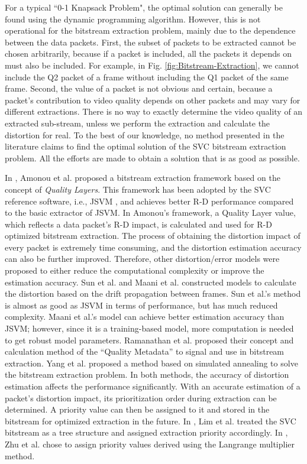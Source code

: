 \documentclass[journal]{IEEEtran}
\begin{document}
For a typical ``0-1 Knapsack Problem", the optimal solution can generally be found using the dynamic programming algorithm. However, this is not operational for the bitstream extraction problem, mainly due to the dependence between the data packets. First, the subset of packets to be extracted cannot be chosen arbitrarily, because if a packet is included, all the packets it depends on must also be included. For example, in Fig. \ref{fig:Bitstream-Extraction}, we cannot include the Q2 packet of a frame without including the Q1 packet of the same frame. Second, the value of a packet is not obvious and certain, because a packet's contribution to video quality depends on other packets and may vary for different extractions. There is no way to exactly determine the video quality of an extracted sub-stream, unless we perform the extraction and calculate the distortion for real. To the best of our knowledge, no method presented in the literature claims to find the optimal solution of the SVC bitstream extraction problem. All the efforts are made to obtain a solution that is as good as possible.

In \cite{Amonou07}, Amonou et al. proposed a bitstream extraction framework based on the concept of \textit{Quality Layers}. This framework has been adopted by the SVC reference software, i.e., JSVM \cite{JSVM}, and achieves better R-D performance compared to the basic extractor of JSVM. In Amonou's framework, a Quality Layer value, which reflects a data packet's R-D impact, is calculated and used for R-D optimized bitstream extraction. The process of obtaining the distortion impact of every packet is extremely time consuming, and the distortion estimation accuracy can also be further improved. Therefore, other distortion/error models were proposed to either reduce the computational complexity or improve the estimation accuracy. Sun et al. \cite{Sun09} and Maani et al. \cite{Maani09} constructed models to calculate the distortion based on the drift propagation between frames. Sun et al.'s method is almost as good as JSVM in terms of performance, but has much reduced complexity. Maani et al.'s model can achieve better estimation accuracy than JSVM; however, since it is a training-based model, more computation is needed to get robust model parameters. Ramanathan et al. \cite{Ramanathan12} proposed their concept and calculation method of the ``Quality Metadata'' to signal and use in bitstream extraction. Yang et al. \cite{Yang13} proposed a method based on simulated annealing to solve the bitstream extraction problem. In both methods, the accuracy of distortion estimation affects the performance significantly. With an accurate estimation of a packet's distortion impact, its prioritization order during extraction can be determined. A priority value can then be assigned to it and stored in the bitstream for optimized extraction in the future. In \cite{Lim06}, Lim et al. treated the SVC bitstream as a tree structure and assigned extraction priority accordingly. In \cite{Zhu11}, Zhu et al. chose to assign priority values derived using the Langrange multiplier method.
\end{document}
